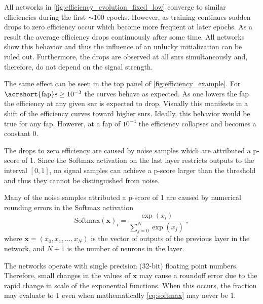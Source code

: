 All networks in \autoref{fig:efficiency_evolution_fixed_low} converge to similar efficiencies during the first $\sim 100$ epochs. However, as training continues sudden drops to zero efficiency occur which become more frequent at later epochs. As a result the average efficiency drops continuously after some time. All networks show this behavior and thus the influence of an unlucky initialization can be ruled out. Furthermore, the drops are observed at all \acrshort{snr}s simultaneously and, therefore, do not depend on the signal strength.

The same effect can be seen in the top panel of \autoref{fig:efficiency_example}. For $\text{\acrshort{fap}s}\geq 10^{-3}$ the curves behave as expected. As one lowers the \acrshort{fap} the efficiency at any given \acrshort{snr} is expected to drop. Visually this manifests in a shift of the efficiency curves toward higher \acrshort{snr}s. Ideally, this behavior would be true for any \acrshort{fap}. However, at a \acrshort{fap} of $10^{-4}$ the efficiency collapses and becomes a constant $0$.

The drops to zero efficiency are caused by noise samples which are attributed a p-score of 1. Since the Softmax activation on the last layer restricts outputs to the interval $\left[0, 1\right]$, no signal samples can achieve a p-score larger than the threshold and thus they cannot be distinguished from noise.

Many of the noise samples attributed a p-score of 1 are caused by numerical rounding errors in the Softmax activation 
\begin{equation}\label{eq:softmax}
    {\text{Softmax}\left(\bm{x}\right)}_i=\frac{\exp\left(x_i\right)}{\sum_{j=0}^N \exp\left(x_j\right)} ~,
\end{equation}
where $\bm{x} = \left(x_0, x_1, \hdots, x_N\right)$ is the vector of outputs of the previous layer in the network, and $N+1$ is the number of neurons in the layer.

The networks operate with single precision (32-bit) floating point numbers. Therefore, small changes in the values of $\bm{x}$ may cause a roundoff error due to the rapid change in scale of the exponential functions. When this occurs, the fraction may evaluate to $1$ even when mathematically \eqref{eq:softmax} may never be $1$.

